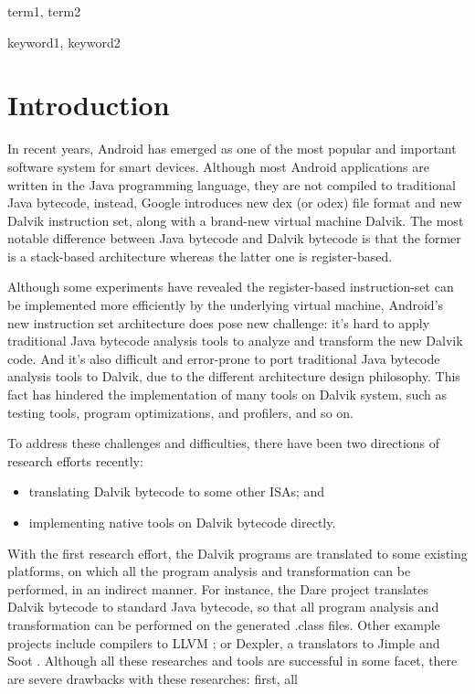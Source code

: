 \documentclass[10pt, preprint, cm]{sigplanconf}
\begin{document}

\terms
term1, term2

\keywords
keyword1, keyword2

\section{Introduction}
In recent years, Android has emerged as one of the most popular and
important software system for smart devices. Although most
Android applications are written in the Java programming language, they
are not compiled to traditional Java bytecode, instead, Google
introduces new dex (or odex) file format and new Dalvik instruction
set, along with a brand-new virtual machine Dalvik. The most notable
difference between Java bytecode and Dalvik bytecode is that the 
former is a stack-based architecture whereas the latter one is
register-based. 

Although some experiments have revealed the register-based
instruction-set can be implemented more efficiently by the underlying
virtual machine, Android's new instruction set architecture 
does pose new challenge: it's hard
to apply traditional Java bytecode analysis tools to analyze
and transform the new Dalvik code. And it's also difficult and
error-prone to port traditional Java bytecode analysis tools
to Dalvik, due to the different architecture design philosophy. This
fact has hindered the implementation of many tools on Dalvik system, such
as testing tools, program optimizations, and profilers, and so on.

To address these challenges and difficulties, there have been two
directions of research efforts recently:
\begin{itemize}
  \item translating Dalvik bytecode to some other ISAs; and
  \item implementing native tools on Dalvik bytecode directly.
\end{itemize}

With the first research effort, the Dalvik programs are translated
to some existing platforms, on which all the program
analysis and transformation can be performed, in an indirect manner.
For instance, the Dare project \cite{dare2012} translates Dalvik
bytecode to standard Java bytecode, so that all program
analysis and transformation can be performed on the
generated .class files. Other example projects include
compilers to LLVM \cite{}; or Dexpler, a translators to Jimple and 
Soot \cite{}. Although all these researches and tools are successful
in some facet, there are severe drawbacks with these researches: first, all
\end{document}
